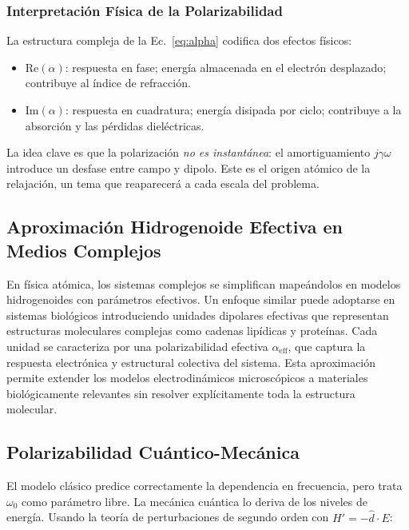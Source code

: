 \documentclass[12pt]{article}
\begin{document}
\subsubsection{Interpretaci\'on F\'isica de la Polarizabilidad}

La estructura compleja de la Ec.~\eqref{eq:alpha} codifica dos efectos f\'isicos:

\begin{itemize}
\item $\text{Re}(\alpha)$: respuesta en fase; energ\'ia almacenada en el electr\'on
desplazado; contribuye al \'indice de refracci\'on.
\item $\text{Im}(\alpha)$: respuesta en cuadratura; energ\'ia disipada por ciclo;
contribuye a la absorci\'on y las p\'erdidas diel\'ectricas.
\end{itemize}

La idea clave es que la polarizaci\'on \emph{no es instant\'anea}: el amortiguamiento
$j\gamma\omega$ introduce un desfase entre campo y dipolo. Este es el origen at\'omico de la
relajaci\'on, un tema que reaparecer\'a a cada escala del problema.

\subsection{Aproximaci\'on Hidrogenoide Efectiva en Medios Complejos}

En f\'isica at\'omica, los sistemas complejos se simplifican mapeándolos en modelos
hidrogenoides con par\'ametros efectivos. Un enfoque similar puede adoptarse en sistemas
biol\'ogicos introduciendo unidades dipolares efectivas que representan estructuras moleculares
complejas como cadenas lip\'idicas y prote\'inas. Cada unidad se caracteriza por una
polarizabilidad efectiva $\alpha_{\text{eff}}$, que captura la respuesta electr\'onica y
estructural colectiva del sistema. Esta aproximaci\'on permite extender los modelos
electrodin\'amicos microsc\'opicos a materiales biol\'ogicamente relevantes sin resolver
expl\'icitamente toda la estructura molecular.

\subsection{Polarizabilidad Cu\'antico-Mec\'anica}

El modelo cl\'asico predice correctamente la dependencia en frecuencia, pero trata $\omega_0$
como par\'ametro libre. La mec\'anica cu\'antica lo deriva de los niveles de energ\'ia. Usando la
teor\'ia de perturbaciones de segundo orden con $H' = -\hat{d}\cdot E$:
\end{document}
